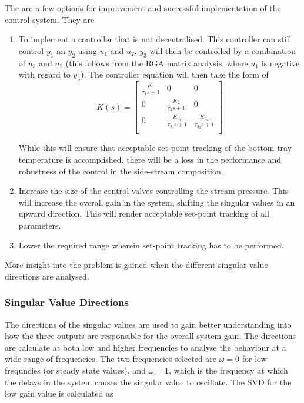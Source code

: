 The are a few options for improvement and successful implementation of the control system. They are

\begin{enumerate}
	\item To implement a controller that is not decentralised. This controller can still control $y_1$ an $y_2$ using $u_1$ and $u_2$. $y_3$ will then be controlled by a combination of $u_3$ and $u_2$ (this follows from the RGA matrix analysis, where $u_1$ is negative with regard to $y_3$). The controller equation will then take the form of
	\begin{equation}
		K(s) = \begin{bmatrix}
		\frac{K_1}{\tau_1s + 1} & 0 & 0\\
		0 &\frac{K_2}{\tau_2s + 1} & 0\\
		0 & \frac{K_{3_1}}{\tau_{3_1}s + 1} & \frac{K_{3_2}}{\tau_{3_2}s + 1}\\
		\end{bmatrix}
	\end{equation}
	
	While this will ensure that acceptable set-point tracking of the bottom tray temperature is accomplished, there will be a loss in the performance and robustness of the control in the side-stream composition.
	
	\item Increase the size of the control valves controlling the stream pressure. This will increase the overall gain in the system, shifting the singular values in an upward direction. This will render acceptable set-point tracking of all parameters.
	
	\item Lower the required range wherein set-point tracking has to be performed. 
\end{enumerate}

More insight into the problem is gained when the different singular value directions are analysed. 

\subsubsection{Singular Value Directions}

The directions of the singular values are used to gain better understanding into how the three outputs are responsible for the overall system gain. The directions are calculate at both low and higher frequencies to analyse the behaviour at a wide range of frequencies. The two frequencies selected are $\omega = 0$ for low frequncies (or steady state values), and $\omega = 1$, which is the frequency at which the delays in the system causes the singular value to oscillate. The SVD for the low gain value is calculated as

